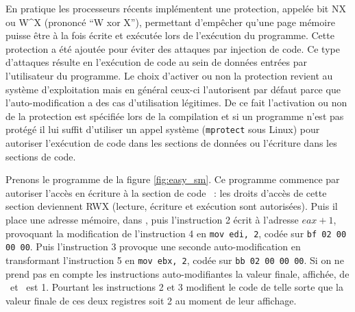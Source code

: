 En pratique les processeurs récents implémentent une protection, appelée bit NX ou W\textasciicircum X (prononcé ``W xor X''), permettant d'empêcher qu'une page mémoire puisse être à la fois écrite et exécutée lors de l'exécution du programme.
Cette protection a été ajoutée pour éviter des attaques par injection de code.
Ce type d'attaques résulte en l'exécution de code au sein de données entrées par l'utilisateur du programme.
Le choix d'activer ou non la protection revient au système d'exploitation mais en général ceux-ci l'autorisent par défaut parce que l'auto-modification a des cas d'utilisation légitimes.
De ce fait l'activation ou non de la protection est spécifiée lors de la compilation et si un programme n'est pas protégé il lui suffit d'utiliser un appel système (\texttt{mprotect} sous Linux) pour autoriser l'exécution de code dans les sections de données ou l'écriture dans les sections de code.


Prenons le programme de la figure \ref{fig:easy_sm}. Ce programme commence par autoriser l'accès en écriture à la section de code \ptext\ : les droits d'accès de cette section deviennent RWX (lecture, écriture et exécution sont autorisées).
Puis il place une adresse mémoire,  dans \eax, puis l'instruction 2 écrit à l'adresse $eax+1$, provoquant la modification de l'instruction 4 en \texttt{mov edi, 2}, codée sur \texttt{bf 02 00 00 00}.
Puis l'instruction 3 provoque une seconde auto-modification en transformant l'instruction 5 en \texttt{mov ebx, 2}, codée sur \texttt{bb 02 00 00 00}.
Si on ne prend pas en compte les instructions auto-modifiantes la valeur finale, affichée, de \edi\ et \ebx\ est 1.
Pourtant les instructions 2 et 3 modifient le code de telle sorte que la valeur finale de ces deux registres soit 2 au moment de leur affichage.

